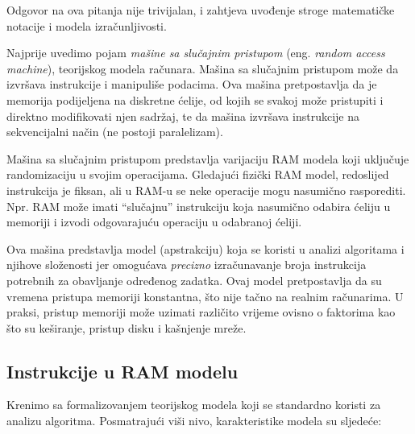 Odgovor na ova pitanja nije trivijalan, i zahtjeva uvođenje stroge matematičke notacije i modela izračunljivosti. 

Najprije uvedimo pojam \textit{mašine sa slučajnim pristupom} (eng. \textit{random access machine}), teorijskog modela računara.  Mašina sa slučajnim pristupom može da izvršava instrukcije i manipuliše podacima. Ova mašina pretpostavlja da je memorija  %
podijeljena na diskretne ćelije, od kojih se svakoj može pristupiti i direktno modifikovati njen sadržaj, te da mašina izvršava instrukcije na sekvencijalni način (ne postoji paralelizam).

Mašina sa slučajnim pristupom predstavlja varijaciju RAM modela koji uključuje randomizaciju u svojim operacijama. Gledajući fizički RAM model, redoslijed instrukcija je fiksan, ali u RAM-u se neke operacije mogu nasumično rasporediti. Npr. RAM može imati ``slučajnu''  instrukciju koja nasumično odabira ćeliju u memoriji i izvodi odgovarajuću operaciju u odabranoj ćeliji.

Ova mašina predstavlja model (apstrakciju) koja se koristi u analizi algoritama i njihove složenosti jer omogućava \textit{precizno} izračunavanje broja instrukcija potrebnih za obavljanje određenog zadatka. Ovaj model pretpostavlja da su vremena pristupa memoriji konstantna, što nije tačno na realnim računarima. U praksi, pristup memoriji može uzimati različito vrijeme ovisno o faktorima kao što su keširanje, pristup disku i kašnjenje mreže.

\subsection{Instrukcije u RAM modelu}
Krenimo sa formalizovanjem teorijskog modela koji 
se standardno koristi za analizu algoritma.  Posmatrajući viši nivo,   karakteristike modela su sljedeće:

